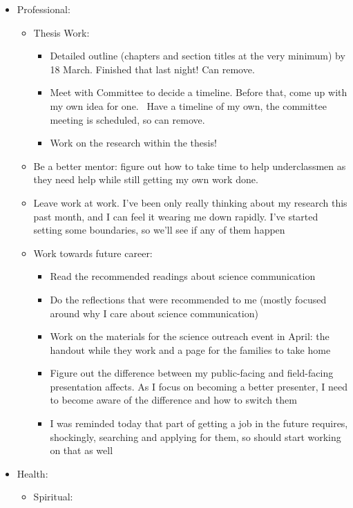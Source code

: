 \documentclass[12pt]{article}[titlepage]
\renewcommand{\,}{\textsuperscript{,}}
\begin{document}
\begin{itemize}   
\item Professional:   
\begin{itemize}   
\item Thesis Work:  
\begin{itemize}   
\item Detailed outline (chapters and section titles at the very minimum) by 18 March. Finished that last night! Can remove.  
\item Meet with Committee to decide a timeline. Before that, come up with my own idea for one.  Have a timeline of my own, the committee meeting is scheduled, so can remove.  
\item Work on the research within the thesis!   
\end{itemize}   
\item Be a better mentor: figure out how to take time to help underclassmen as they need help while still getting my own work done.   
\item Leave work at work. I've been only really thinking about my research this past month, and I can feel it wearing me down rapidly.  
I've started setting some boundaries, so we'll see if any of them happen  
\item Work towards future career:   
\begin{itemize}   
\item Read the recommended readings about science communication   
\item Do the reflections that were recommended to me (mostly focused around why I care about science communication)   
\item Work on the materials for the science outreach event in April: the handout while they work and a page for the families to take home   
\item Figure out the difference between my public-facing and field-facing presentation affects. As I focus on becoming a better presenter, I need to become aware of the difference and how to switch them   
\item I was reminded today that part of getting a job in the future requires, shockingly, searching and applying for them, so should start working on that as well  
\end{itemize}   
\end{itemize}   
\item Health:  
\begin{itemize}   
\item Spiritual:   
\begin{itemize}   

\end{itemize}
\end{itemize}
\end{itemize}
\end{document}
